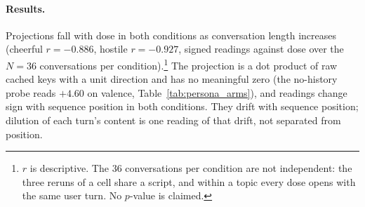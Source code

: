 \documentclass[11pt,a4paper]{article}
\begin{document}
\paragraph{Results.}

Projections fall with dose in both conditions as conversation length
increases (cheerful $r{=}-0.886$, hostile $r{=}-0.927$, signed readings
against dose over the $N{=}36$ conversations per condition).\footnote{$r$ is descriptive. The 36 conversations per condition are not
independent: the three reruns of a cell share a script, and within a
topic every dose opens with the same user turn. No $p$-value is
claimed.} The projection is a dot product of
raw cached keys with a unit direction and has no meaningful zero (the
no-history probe reads $+4.60$ on valence, Table~\ref{tab:persona_arms}),
and readings change sign with sequence position in both conditions. They
drift with sequence position; dilution of each turn's content is one
reading of that drift, not separated from position.
\end{document}
